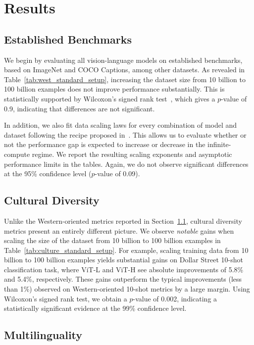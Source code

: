 \section{Results}\label{sect:results}

\subsection{Established Benchmarks}\label{sect:results_west}
We begin by evaluating all vision-language models on established benchmarks, based on ImageNet and COCO Captions, among other datasets. As revealed in Table~\ref{tab:west_standard_setup}, increasing the dataset size from 10 billion to 100 billion examples does not improve performance substantially. This is statistically supported by Wilcoxon's signed rank test~\cite{wilcoxon1992individual}, which gives a $p$-value of 0.9, indicating that differences are not significant.


In addition, we also fit data scaling laws for every combination of model and dataset following the recipe proposed in~\citet{alabdulmohsin2022revisiting}. This allows us to evaluate whether or not the performance gap is expected to increase or decrease in the infinite-compute regime. We report the resulting scaling exponents and asymptotic performance limits in the tables. Again, we do not observe  significant differences at the 95\% confidence level ($p$-value of 0.09).


\subsection{Cultural Diversity}
Unlike the Western-oriented metrics reported in Section~\ref{sect:results_west}, cultural diversity metrics present an entirely different picture. We observe \emph{notable} gains when scaling the size of the dataset from 10 billion to 100 billion examples in Table~\ref{tab:culture_standard_setup}. 
For example, scaling training data from 10 billion to 100 billion examples yields substantial gains on Dollar Street 10-shot classification task, where ViT-L and ViT-H see absolute improvements of 5.8\% and 5.4\%, respectively. These gains outperform the typical improvements (less than 1\%) observed on Western-oriented 10-shot metrics by a large margin.
Using Wilcoxon's signed rank test, we obtain a $p$-value of 0.002, indicating a statistically significant evidence at the 99\% confidence level.


\subsection{Multilinguality}

